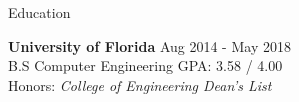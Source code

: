 \documentclass{resume} %
\begin{document}

\begin{rSection}{Education}

{\bf University of Florida} \hfill {Aug 2014 - May 2018} 
\\ B.S Computer Engineering \hfill {GPA: 3.58 / 4.00}
\\ Honors: \textit{College of Engineering Dean's List}  

\end{rSection}

\end{document}
